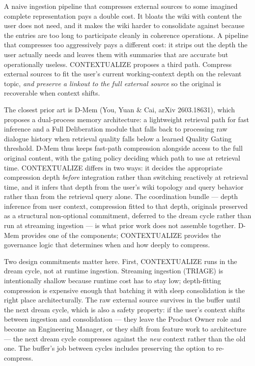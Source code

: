 \documentclass[
  11pt,
]{article}
\begin{document}
A naive ingestion pipeline that compresses external sources to some
imagined complete representation pays a double cost. It bloats the wiki
with content the user does not need, and it makes the wiki harder to
consolidate against because the entries are too long to participate
cleanly in coherence operations. A pipeline that compresses too
aggressively pays a different cost: it strips out the depth the user
actually needs and leaves them with summaries that are accurate but
operationally useless. CONTEXTUALIZE proposes a third path. Compress
external sources to fit the user's current working-context depth on the
relevant topic, \emph{and preserve a linkout to the full external
source} so the original is recoverable when context shifts.

The closest prior art is D-Mem (You, Yuan \& Cai, arXiv 2603.18631),
which proposes a dual-process memory architecture: a lightweight
retrieval path for fast inference and a Full Deliberation module that
falls back to processing raw dialogue history when retrieval quality
falls below a learned Quality Gating threshold. D-Mem thus keeps
fast-path compression alongside access to the full original content,
with the gating policy deciding which path to use at retrieval time.
CONTEXTUALIZE differs in two ways: it decides the appropriate
compression depth \emph{before} integration rather than switching
reactively at retrieval time, and it infers that depth from the user's
wiki topology and query behavior rather than from the retrieval query
alone. The coordination bundle --- depth inference from user context,
compression fitted to that depth, originals preserved as a structural
non-optional commitment, deferred to the dream cycle rather than run at
streaming ingestion --- is what prior work does not assemble together.
D-Mem provides one of the components; CONTEXTUALIZE provides the
governance logic that determines when and how deeply to compress.

Two design commitments matter here. First, CONTEXTUALIZE runs in the
dream cycle, not at runtime ingestion. Streaming ingestion (TRIAGE) is
intentionally shallow because runtime cost has to stay low;
depth-fitting compression is expensive enough that batching it with
sleep consolidation is the right place architecturally. The raw external
source survives in the buffer until the next dream cycle, which is also
a safety property: if the user's context shifts between ingestion and
consolidation --- they leave the Product Owner role and become an
Engineering Manager, or they shift from feature work to architecture ---
the next dream cycle compresses against the \emph{new} context rather
than the old one. The buffer's job between cycles includes preserving
the option to re-compress.
\end{document}
